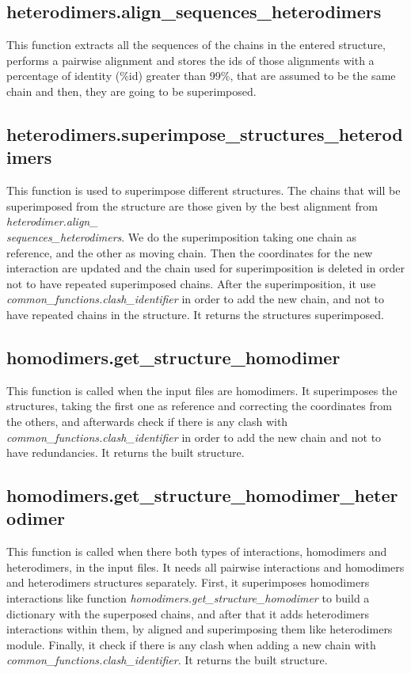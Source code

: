 \documentclass[a4paper,10pt]{report}
\begin{document}
\subsection{heterodimers.align\_sequences\_heterodimers}

This function extracts all the sequences of the chains in the entered structure, performs a pairwise alignment and stores the ids of those alignments with a percentage of identity (\%id) greater than 99\%, that are assumed to be the same chain and then, they are going to be superimposed. 

\subsection{heterodimers.superimpose\_structures\_heterodimers}

This function is used to superimpose different structures. The chains that will be superimposed from the structure are those given by the best alignment from \textit{heterodimer.align\_\\sequences\_heterodimers}. 
We do the superimposition taking one chain as reference, and the other as moving chain. Then the coordinates for the new interaction are updated and the chain used for superimposition is deleted in order not to have repeated superimposed chains. 
After the superimposition, it use \textit{common\_functions.clash\_identifier} in order to add the new chain, and not to have repeated chains in the structure. It returns the structures superimposed.

\subsection{homodimers.get\_structure\_homodimer}

This function is called when the input files are homodimers. It superimposes the structures, taking the first one as reference and correcting the coordinates from the others, and afterwards check if there is any clash with  \textit{common\_functions.clash\_identifier} in order to add the new chain and not to have redundancies. It returns the built structure.

\subsection{homodimers.get\_structure\_homodimer\_heterodimer}

This function is called when there both types of interactions, homodimers and heterodimers, in the input files. It needs all pairwise interactions and homodimers and heterodimers structures separately. First, it superimposes homodimers interactions like function \textit{homodimers.get\_structure\_homodimer} to build a dictionary with the superposed chains, and after that it adds heterodimers interactions within them, by aligned and superimposing them like heterodimers module. Finally, it check if there is any clash when adding a new chain with \textit{common\_functions.clash\_identifier}. It returns the built structure.
\end{document}
